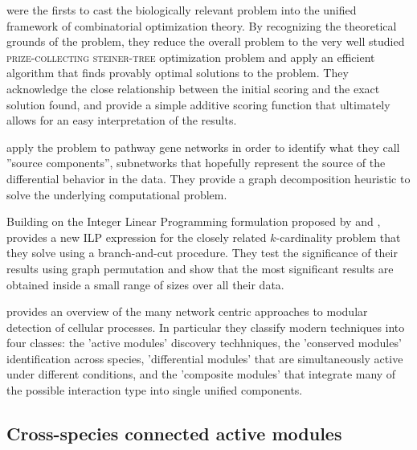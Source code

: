 	\Textcites{dittrich2008identifying} were the firsts to cast the biologically relevant problem into the unified framework of combinatorial optimization theory. %
	By recognizing the theoretical grounds of the \mwcs{} problem, they reduce the overall problem to the very well studied \textsc{prize-collecting steiner-tree} optimization problem and apply an efficient algorithm \parencite{ljubic2006algorithmic} that finds provably optimal solutions to the problem.
	They acknowledge the close relationship between the initial scoring and the exact solution found, and provide a simple additive scoring function that ultimately allows for an easy interpretation of the results.


	\Textcite{yamamoto2009better} apply the \mwcs{} problem to pathway gene networks in order to identify what they call ''source components'', subnetworks that hopefully represent the source of the differential behavior in the data.
	They provide a graph decomposition heuristic to solve the underlying computational problem.

	Building on the Integer Linear Programming formulation proposed by \textcite{dittrich2008identifying} and \textcite{zhao2008uncovering}, \textcite{backes2012integer} provides a new ILP expression for the closely related $k$-cardinality \mwcs{} problem that they solve using a branch-and-cut procedure.
	They test the significance of their results using graph permutation and show that the most significant results are obtained inside a small range of sizes over all their data.

	\Textcite{mitra2013integrative} provides an overview of the many network centric approaches to modular detection of cellular processes.
	In particular they classify modern techniques into four classes: the 'active modules' discovery techhniques, the 'conserved modules' identification across species, 'differential modules' that are simultaneously active under different conditions, and the 'composite modules' that integrate many of the possible interaction type into single unified components.


\subsection{Cross-species connected active modules}

